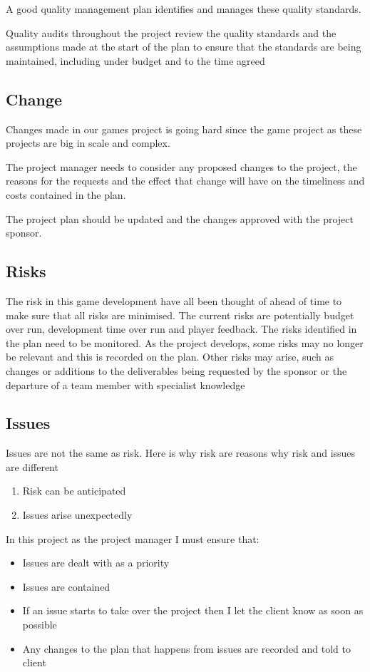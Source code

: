 \documentclass{article}
\begin{document}
A good quality management plan identifies and manages these quality standards.

Quality audits throughout the project review the quality standards and the assumptions made at the start of the plan to ensure that the standards are being maintained, including under budget and to the time agreed


\subsection{Change}
Changes made in our games project is going hard since the game project as these projects are big in scale and complex.

The project manager needs to consider any proposed changes to the project, the reasons for the requests and the effect that change will have on the timeliness and costs contained in the plan.

The project plan should be updated and the changes approved with the project sponsor.

\subsection{Risks}
The risk in this game development have all been thought of ahead of time to make sure that all risks are minimised. The current risks are potentially budget over run, development time over run and player feedback.
The risks identified in the plan need to be monitored. As the project develops, some risks may no longer be relevant and this is recorded on the plan. 
Other risks may arise, such as changes or additions to the deliverables being requested by the sponsor or the departure of a team member with specialist knowledge

\subsection{Issues}
Issues are not the same as risk. Here is why risk are reasons why risk and issues are different
\begin{enumerate}
	\item Risk can be anticipated
	\item Issues arise unexpectedly
\end{enumerate}

In this project as the project manager I must ensure that:
\begin{itemize}
	\item Issues are dealt with as a priority
	\item Issues are contained
	\item If an issue starts to take over the project then I let the client know as soon as possible
	\item Any changes to the plan that happens from issues are recorded and told to client
\end{itemize}
\end{document}
